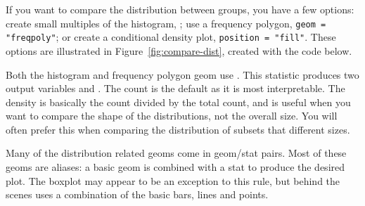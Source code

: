 If you want to compare the distribution between groups, you have a few options: create small multiples of the histogram, ; use a frequency polygon, {\tt geom = "freqpoly"}; or create a conditional density plot, {\tt position = "fill"}. These options are illustrated in Figure~\ref{fig:compare-dist}, created with the code below.

% 


\noindent Both the histogram and frequency polygon geom use .  This statistic produces two output variables  and .  The count is the default as it is most interpretable.  The density is basically the count divided by the total count, and is useful when you want to compare the shape of the distributions, not the overall size.  You will often prefer this when comparing the distribution of subsets that different sizes.

Many of the distribution related geoms come in geom/stat pairs.  Most of these geoms are aliases: a basic geom is combined with a stat to produce the desired plot.  The boxplot may appear to be an exception to this rule, but behind the scenes  uses a combination of the basic bars, lines and points.

